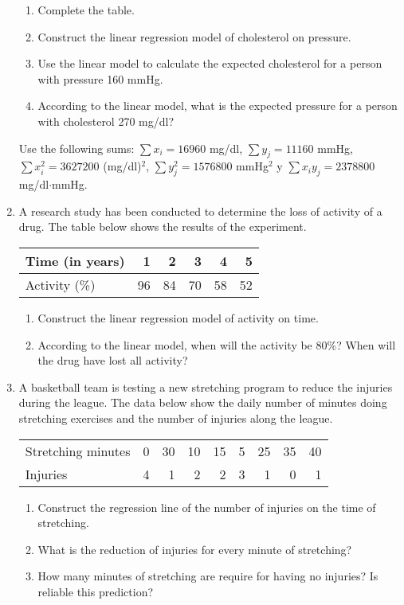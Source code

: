 \begin{enumerate}[leftmargin=*,resume]
\begin{enumerate}
\item Complete the table.
\item Construct the linear regression model of cholesterol on pressure. 
\item Use the linear model to calculate the expected cholesterol for a person with pressure 160 mmHg. 
\item According to the linear model, what is the expected pressure for a person with cholesterol 270 mg/dl?
\end{enumerate}

Use the following sums:
$\sum x_i=16960$ mg/dl, $\sum y_j=11160$ mmHg, $\sum x_i^2=3627200$ (mg/dl)$^2$, $\sum y_j^2=1576800$ mmHg$^2$ y
$\sum x_iy_j=2378800$ mg/dl$\cdot$mmHg.

\item A research study has been conducted to determine the loss of activity of a drug.
The table below shows the results of the experiment.

\begin{center}
\begin{tabular}{|l|r|r|r|r|r|}
\hline
Time (in years) & 1 & 2 & 3 & 4 & 5 \\ \hline
Activity (\%) & 96 & 84 & 70 & 58 & 52 \\ \hline
\end{tabular}
\end{center}

\begin{enumerate}
\item  Construct the linear regression model of activity on time.
\item  According to the linear model, when will the activity be 80\%? When will the drug have lost all activity?
\end{enumerate}

\item A basketball team is testing a new stretching program to reduce the injuries during the league. 
The data below show the daily number of minutes doing stretching exercises and the number of injuries along the league. 
\begin{center}
\begin{tabular}{lrrrrrrrr}
\toprule
Stretching minutes & 0 & 30 & 10 & 15 & 5 & 25 & 35 & 40\\
Injuries & 4 & 1 & 2 & 2 & 3 & 1 & 0 & 1\\
\bottomrule
\end{tabular}
\end{center}
\begin{enumerate}
\item Construct the regression line of the number of injuries on the time of stretching. 
\item What is the reduction of injuries for every minute of stretching? 
\item How many minutes of stretching are require for having no injuries? Is reliable this prediction?
\end{enumerate}


\end{enumerate}
